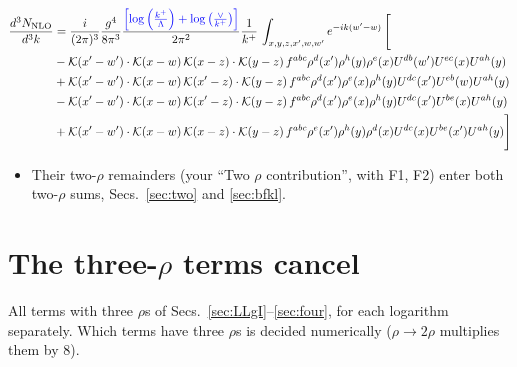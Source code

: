 \documentclass[10pt]{article}
\numberwithin{equation}{section}
\newcommand{\new}[1]{{\color{blue}#1}}
\begin{document}
\begin{align}
      \frac{d^{3}N_{\rm NLO}}{d^{3}k} & = \frac{i}{(2\pi)^{3}}\frac{g^{4}}{8\pi^{3}}\frac{\new{\left[\log{\left(\frac{k^{+}}{\Lambda}\right)}+\log{\left(\frac{\vee}{k^{+}}\right)}\right]}}{2\pi^{2}} \frac{1}{k^{+}}\,\int_{x,y,z,x^{\prime},w,w^{\prime}}e^{-ik(w^{\prime}-w)}\, \Bigg[\notag \\ & - \mathcal{K}(x'-w')\cdot \mathcal{K}(x-w)\, \mathcal{K}(x-z)\cdot \mathcal{K}(y-z)\, f^{a b c} \rho^{d}(x') \rho^{h}(y) \rho^{e}(x) U^{d b}(w') U^{e c}(x) U^{a h}(y)\nonumber\\
    &+ \mathcal{K}(x'-w')\cdot \mathcal{K}(x-w)\,\mathcal{K}(x'-z)\cdot \mathcal{K}(y-z)\, f^{a b c} \rho^{d}(x') \rho^{e}(x) \rho^{h}(y) U^{d c}(x') U^{e b}(w) U^{a h}(y)\nonumber\\
    &- \mathcal{K}(x'-w')\cdot \mathcal{K}(x-w)\,\mathcal{K}(x'-z)\cdot \mathcal{K}(y-z)\, f^{a b c} \rho^{d}(x') \rho^{e}(x) \rho^{h}(y) U^{d c}(x') U^{b e}(x) U^{a h}(y)\nonumber\\
    &+  \mathcal{K}(x'-w')\cdot \mathcal{K}(x-w)\, \mathcal{K}(x-z)\cdot \mathcal{K}(y-z)\, f^{a b c} \rho^{e}(x') \rho^{h}(y) \rho^{d}(x) U^{d c}(x) U^{b e}(x') U^{a h}(y) \Bigg]
\label{eq:fourb}
\end{align}
\begin{itemize}
\item Their two-$\rho$ remainders (your ``Two $\rho$ contribution'', with F1, F2) enter both two-$\rho$ sums, Secs.~\ref{sec:two} and \ref{sec:bfkl}.
\end{itemize}

\section{The three-\texorpdfstring{$\rho$}{rho} terms cancel}\label{sec:three}
All terms with three $\rho$\textquotesingle s of Secs.~\ref{sec:LLgI}--\ref{sec:four}, for each logarithm separately. Which terms have three $\rho$\textquotesingle s is decided numerically ($\rho\to2\rho$ multiplies them by 8).
\end{document}
